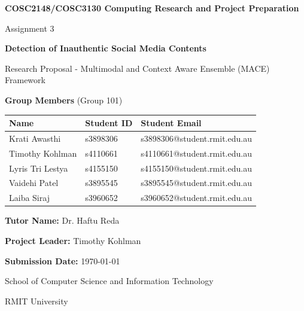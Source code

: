 \documentclass[a4paper,11pt]{article}
\makeatletter
\newcommand{\subject}{COSC2148/COSC3130 Computing Research and Project Preparation}
\newcommand{\assignment}{Assignment 3}
\newcommand{\institution}{RMIT University}
\newcommand{\school}{School of Computer Science and Information Technology}
\newcommand{\dateSubmitted}{\today}
\newcommand{\tutor}{Dr. Haftu Reda}
\newcommand{\projectLeader}{Timothy Kohlman}
\newcommand{\memberA}{Krati Awasthi & s3898306 & s3898306@student.rmit.edu.au}
\newcommand{\memberB}{Timothy Kohlman & s4110661 & s4110661@student.rmit.edu.au}
\newcommand{\memberC}{Lyris Tri Lestya & s4155150 & s4155150@student.rmit.edu.au}
\newcommand{\memberD}{Vaidehi Patel & s3895545 & s3895545@student.rmit.edu.au}
\newcommand{\memberE}{Laiba Siraj & s3960652 & s3960652@student.rmit.edu.au}
\makeatother
\begin{document}
\begin{titlepage}
\centering

\vspace*{1cm}

{\Huge \textbf{\subject} \par}
\vspace{1cm}

{\LARGE \assignment \par}

\vspace{1cm}


{\LARGE \textbf{Detection of Inauthentic Social Media Contents} \par}
{\LARGE Research Proposal - Multimodal and Context Aware Ensemble (MACE) Framework \par}

\vspace{1cm}

{\Large \textbf{Group Members} (Group 101)\par}
\vspace{0.5cm}

\begin{tabular}{|l|l|l|}
    \hline
    \textbf{Name} & \textbf{Student ID} & \textbf{Student Email} \\
    \hline
    \memberA \\
    \memberB \\
    \memberC \\
    \memberD \\
    \memberE \\
    \hline
\end{tabular}

\vspace{1cm}

{\Large \textbf{Tutor Name:} \tutor \par}
{\Large \textbf{Project Leader:} \projectLeader \par}
{\Large \textbf{Submission Date:} \dateSubmitted \par}

\vspace{0.5cm}

{\Large \school \par}

\vspace{0.5cm}

{\Large \institution \par}

\vspace{0.5cm}

\vfill

\end{titlepage}
\end{document}
